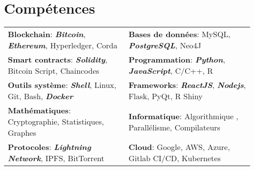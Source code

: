\documentclass[10pt]{article}
\begin{document}
 
\section*{Compétences}
\begin{tabular}{ l l }
\textbf{Blockchain}: \textbf{\textit{Bitcoin}}, \textbf{\textit{Ethereum}}, Hyperledger, Corda & \textbf{Bases de données}: MySQL, \textbf{\textit{PostgreSQL}}, Neo4J \\[0.1cm]
\textbf{Smart contracts}: \textbf{\textit{Solidity}}, Bitcoin Script, Chaincodes & \textbf{Programmation}: \textbf{\textit{Python}}, \textbf{\textit{JavaScript}}, C/C++, R  \\[0.1cm]
\textbf{Outils système}: \textbf{\textit{Shell}}, Linux, Git, Bash, \textbf{\textit{Docker}} & \textbf{Frameworks}: \textbf{\textit{ReactJS}}, \textbf{\textit{Nodejs}}, Flask, PyQt, R Shiny \\[0.1cm]
\textbf{Mathématiques}: Cryptographie, Statistiques, Graphes & \textbf{Informatique}: Algorithmique , Parallélisme, Compilateurs \\[0.1cm]
\textbf{Protocoles}: \textbf{\textit{Lightning Network}}, IPFS, BitTorrent & \textbf{Cloud}: Google, AWS, Azure, Gitlab CI/CD, Kubernetes
\end{tabular}



\end{document}
